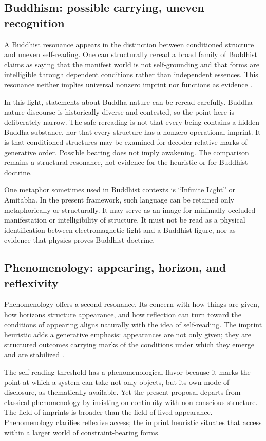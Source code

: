 \documentclass[12pt,a4paper]{article}
\begin{document}
\subsection{Buddhism: possible carrying, uneven recognition}

A Buddhist resonance appears in the distinction between conditioned
structure and uneven self-reading. One can structurally reread a broad
family of Buddhist claims as saying that the manifest world is not
self-grounding and that forms are intelligible through dependent
conditions rather than independent essences. This resonance neither
implies universal nonzero imprint nor functions as evidence
\cite{Lusthaus2002,Waldron2003,Garfield2002}.

In this light, statements about Buddha-nature can be reread carefully.
Buddha-nature discourse is historically diverse and contested, so the
point here is deliberately narrow. The safe rereading is not that every
being contains a hidden Buddha-substance, nor that every structure has a
nonzero operational imprint. It is that conditioned structures may be
examined for decoder-relative marks of generative order. Possible
bearing does not imply awakening. The comparison remains a structural
resonance, not evidence for the heuristic or for Buddhist doctrine.

One metaphor sometimes used in Buddhist contexts is ``Infinite Light'' or Amitabha. In the present framework, such language can be retained only metaphorically or structurally. It may serve as an image for minimally occluded manifestation or intelligibility of structure. It must not be read as a physical identification between electromagnetic light and a Buddhist figure, nor as evidence that physics proves Buddhist doctrine.

\subsection{Phenomenology: appearing, horizon, and reflexivity}

Phenomenology offers a second resonance. Its concern with how things are given, how horizons structure appearance, and how reflection can turn toward the conditions of appearing aligns naturally with the idea of self-reading. The imprint heuristic adds a generative emphasis: appearances are not only given; they are structured outcomes carrying marks of the conditions under which they emerge and are stabilized \cite{VarelaThompsonRosch1991,Thompson2007}.

The self-reading threshold has a phenomenological flavor because it marks the point at which a system can take not only objects, but its own mode of disclosure, as thematically available. Yet the present proposal departs from classical phenomenology by insisting on continuity with non-conscious structure. The field of imprints is broader than the field of lived appearance. Phenomenology clarifies reflexive access; the imprint heuristic situates that access within a larger world of constraint-bearing forms.
\end{document}
